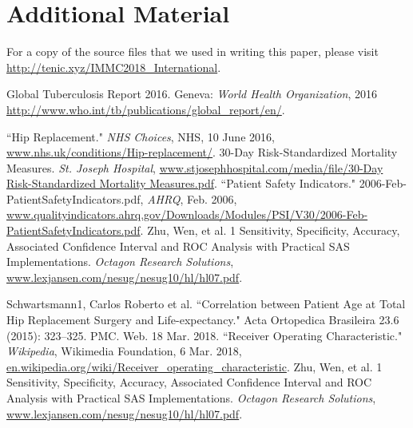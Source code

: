 \documentclass{article}
\begin{document}
\section{Additional Material}
\flushleft For a copy of the source files that we used in writing this paper, please visit \url{http://tenic.xyz/IMMC2018_International}.

\newpage
\begin{thebibliography}{9}
\raggedright

Global Tuberculosis Report 2016. Geneva: \textit{World Health Organization}, 2016 \url{http://www.who.int/tb/publications/global_report/en/}. 

``Hip Replacement." \textit{NHS Choices}, NHS, 10 June 2016, \url{www.nhs.uk/conditions/Hip-replacement/}. 
30-Day Risk-Standardized Mortality Measures. \textit{St. Joseph Hospital}, \url{www.stjosephhospital.com/media/file/30-Day Risk-Standardized Mortality Measures.pdf}. 
``Patient Safety Indicators." 2006-Feb-PatientSafetyIndicators.pdf, \textit{AHRQ}, Feb. 2006, \url{www.qualityindicators.ahrq.gov/Downloads/Modules/PSI/V30/2006-Feb-PatientSafetyIndicators.pdf}. 
Zhu, Wen, et al. 1 Sensitivity, Specificity, Accuracy, Associated Confidence Interval and ROC Analysis with Practical SAS \textregistered  Implementations. \textit{Octagon Research Solutions}, \url{www.lexjansen.com/nesug/nesug10/hl/hl07.pdf}. 

Schwartsmann1, Carlos Roberto et al. ``Correlation between Patient Age at Total Hip Replacement Surgery and Life-expectancy." Acta Ortopedica Brasileira 23.6 (2015): 323–325. PMC. Web. 18 Mar. 2018.
``Receiver Operating Characteristic." \textit{Wikipedia}, Wikimedia Foundation, 6 Mar. 2018, \url{en.wikipedia.org/wiki/Receiver\_operating\_characteristic}. 
Zhu, Wen, et al. 1 Sensitivity, Specificity, Accuracy, Associated Confidence Interval and ROC Analysis with Practical SAS \textregistered Implementations. \textit{Octagon Research Solutions}, \url{www.lexjansen.com/nesug/nesug10/hl/hl07.pdf}. 

\end{thebibliography}
\end{document}
